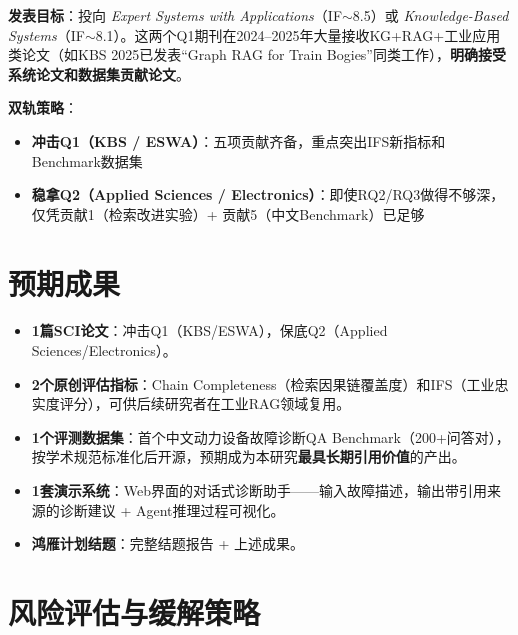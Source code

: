 \documentclass[a4paper, 11pt]{ctexart}
\begin{document}
\begin{tcolorbox}[colback=bglight, colframe=tsinghua!30, arc=2mm]
\textbf{发表目标}：投向 \textit{Expert Systems with Applications}（IF$\sim$8.5）或 \textit{Knowledge-Based Systems}（IF$\sim$8.1）。这两个Q1期刊在2024--2025年大量接收KG+RAG+工业应用类论文（如KBS 2025已发表``Graph RAG for Train Bogies''同类工作），\textbf{明确接受系统论文和数据集贡献论文}。

\textbf{双轨策略}：
\begin{itemize}[itemsep=2pt]
    \item \textbf{冲击Q1（KBS / ESWA）}：五项贡献齐备，重点突出IFS新指标和Benchmark数据集
    \item \textbf{稳拿Q2（Applied Sciences / Electronics）}：即使RQ2/RQ3做得不够深，仅凭贡献1（检索改进实验）+ 贡献5（中文Benchmark）已足够
\end{itemize}
\end{tcolorbox}


\section{预期成果}

\begin{itemize}
    \item \textbf{1篇SCI论文}：冲击Q1（KBS/ESWA），保底Q2（Applied Sciences/Electronics）。
    \item \textbf{2个原创评估指标}：Chain Completeness（检索因果链覆盖度）和IFS（工业忠实度评分），可供后续研究者在工业RAG领域复用。
    \item \textbf{1个评测数据集}：首个中文动力设备故障诊断QA Benchmark（200+问答对），按学术规范标准化后开源，预期成为本研究\textbf{最具长期引用价值}的产出。
    \item \textbf{1套演示系统}：Web界面的对话式诊断助手——输入故障描述，输出带引用来源的诊断建议 + Agent推理过程可视化。
    \item \textbf{鸿雁计划结题}：完整结题报告 + 上述成果。
\end{itemize}


\section{风险评估与缓解策略}
\end{document}
